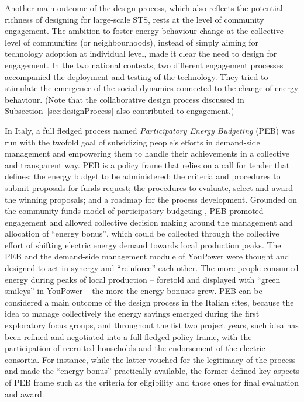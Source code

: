 Another main outcome of the design process, which also reflects the potential richness of designing for large-scale STS, rests at the level of community engagement. %
The ambition to foster energy behaviour change at the collective level of communities (or neighbourhoods),
instead of simply aiming for technology adoption at individual level, made it clear the need to design for
engagement.
% 
In the two national contexts, two different engagement processes accompanied the deployment and testing of the technology. They tried to stimulate the emergence of the social dynamics connected to the change of energy behaviour. (Note that the collaborative design process discussed in Subsection~\ref{sec:designProcess} also contributed to engagement.)

In Italy, a full fledged process named \textit{Participatory Energy Budgeting} (PEB) \cite{capaccioli_exploring_2017,capaccioli_exploring_2016}
was run with the twofold goal of subsidizing people's efforts in demand-side management
and empowering them to handle their achievements in a collective and transparent way.
%
PEB is a policy frame that relies on a call for tender that
defines: the energy budget to be administered;
the criteria and procedures to submit proposals for funds request; the procedures
to evaluate, select and award the winning proposals; and a roadmap for the process development. 
Grounded on the community funds model of participatory budgeting \cite{Ganuza2012,Sintomer2008},
PEB promoted engagement and allowed collective decision
making around the management and allocation of ``energy bonus'', which could be
collected through the collective effort of shifting electric energy demand
towards local production peaks.
% 
The PEB and the demand-side management module of YouPower
were thought and designed to act in synergy and ``reinforce'' each other.
The more people consumed energy during peaks of local production -- foretold and displayed
with ``green smileys'' in YouPower -- the more the energy bonuses grew.
% 
PEB can be considered a main outcome of the design process in the Italian sites, because 
the idea to manage collectively the energy savings emerged during the first exploratory focus groups,
and throughout the fist two project years, such idea has been refined and negotiated into
a full-fledged policy frame, with the participation of recruited households and the endorsement
of the electric consortia. For instance, while the latter vouched for the legitimacy of the process
and made the ``energy bonus'' practically available, the former defined key aspects of PEB frame such as the criteria for eligibility and those ones for final evaluation and award.  


